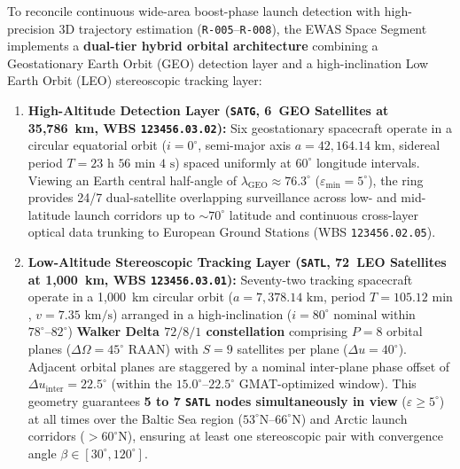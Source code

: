 \documentclass[11pt,a4paper]{article}
\providecommand{\abbr}[1]{#1}
\begin{document}
To reconcile continuous wide-area boost-phase launch detection with high-precision 3D trajectory estimation (\texttt{R-005}--\texttt{R-008}), the \abbr{EWAS} Space Segment implements a \textbf{dual-tier hybrid orbital architecture} combining a Geostationary Earth Orbit (\abbr{GEO}) detection layer and a high-inclination Low Earth Orbit (\abbr{LEO}) stereoscopic tracking layer:
\begin{enumerate}
    \item \textbf{High-Altitude Detection Layer (\texttt{SATG}, 6~\abbr{GEO} Satellites at 35,786~km, \abbr{WBS} \texttt{123456.03.02}):} Six geostationary spacecraft operate in a circular equatorial orbit ($i = 0^\circ$, semi-major axis $a = 42{,}164.14\text{ km}$, sidereal period $T = 23\text{ h }56\text{ min }4\text{ s}$) spaced uniformly at $60^\circ$ longitude intervals. Viewing an Earth central half-angle of $\lambda_{\text{GEO}} \approx 76.3^\circ$ ($\varepsilon_{\min} = 5^\circ$), the ring provides 24/7 dual-satellite overlapping surveillance across low- and mid-latitude launch corridors up to $\sim 70^\circ$ latitude and continuous cross-layer optical data trunking to European Ground Stations (\abbr{WBS} \texttt{123456.02.05}).
    \item \textbf{Low-Altitude Stereoscopic Tracking Layer (\texttt{SATL}, 72~\abbr{LEO} Satellites at 1,000~km, \abbr{WBS} \texttt{123456.03.01}):} Seventy-two tracking spacecraft operate in a 1,000~km circular orbit ($a = 7{,}378.14\text{ km}$, period $T = 105.12\text{ min}$, $v = 7.35\text{ km/s}$) arranged in a high-inclination ($i = 80^\circ$ nominal within $78^\circ\text{--}82^\circ$) \textbf{Walker Delta $72/8/1$ constellation} comprising $P = 8$ orbital planes ($\Delta\Omega = 45^\circ$ RAAN) with $S = 9$ satellites per plane ($\Delta u = 40^\circ$). Adjacent orbital planes are staggered by a nominal inter-plane phase offset of $\Delta u_{\text{inter}} = 22.5^\circ$ (within the $15.0^\circ\text{--}22.5^\circ$ GMAT-optimized window). This geometry guarantees \textbf{5 to 7 \texttt{SATL} nodes simultaneously in view} ($\varepsilon \ge 5^\circ$) at all times over the Baltic Sea region ($53^\circ\text{N}\text{--}66^\circ\text{N}$) and Arctic launch corridors ($> 60^\circ\text{N}$), ensuring at least one stereoscopic pair with convergence angle $\beta \in [30^\circ, 120^\circ]$.
\end{enumerate}
\end{document}
